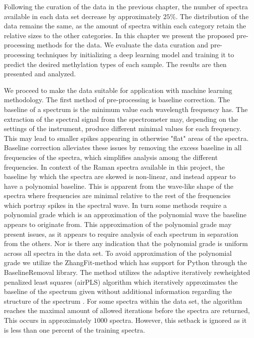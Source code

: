 Following the curation of the data in the previous chapter, the number of spectra available in each data set decrease by approximately $25\%$. The distribution of the data remains the same, as the amount of spectra within each category retain the relative sizes to the other categories. In this chapter we present the proposed pre-processing methods for the data. We evaluate the data curation and pre-processing techniques by initializing a deep learning model and training it to predict the desired methylation types of each sample. The results are then presented and analyzed.

We proceed to make the data suitable for application with machine learning methodology. The first method of pre-processing is baseline correction. The baseline of a spectrum is the minimum value each wavelength frequency has. The extraction of the spectral signal from the spectrometer may, depending on the settings of the instrument, produce different minimal values for each frequency. This may lead to smaller spikes appearing in otherwise "flat" areas of the spectra. Baseline correction alleviates these issues by removing the excess baseline in all frequencies of the spectra, which simplifies analysis among the different frequencies. In context of the Raman spectra available in this project, the baseline by which the spectra are skewed is non-linear, and instead appear to have a polynomial baseline. This is apparent from the wave-like shape of the spectra where frequencies are minimal relative to the rest of the frequencies which portray spikes in the spectral wave. In turn some methods require a polynomial grade which is an approximation of the polynomial wave the baseline appears to originate from. This approximation of the polynomial grade may present issues, as it appears to require analysis of each spectrum in separation from the others. Nor is there any indication that the polynomial grade is uniform across all spectra in the data set. To avoid approximation of the polynomial grade we utilize the ZhangFit-method which has support for Python through the BaselineRemoval library. The method utilizes the adaptive iteratively rewheighted penalized least squares (airPLS) algorithm which iteratively approximates the baseline of the spectrum given without additional information regarding the structure of the spectrum \cite{zhang2010baseline}. For some spectra within the data set, the algorithm reaches the maximal amount of allowed iterations before the spectra are returned, This occurs in approximately $1000$ spectra. However, this setback is ignored as it is less than one percent of the training spectra. 

